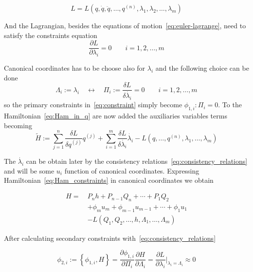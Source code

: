 \begin{equation*}
  L = L(
  q, \dot{q}, \ddot{q}, \ldots, q^{(n)},
  \lambda_1, \lambda_2, \ldots, \lambda_m
  )
\end{equation*}

And the Lagrangian, besides the equations of motion~\eqref{eq:euler-lagrange},
need to satisfy the constraints equation
\begin{equation}
  \frac{\partial L}{\partial \lambda_i} = 0 \qquad i=1, 2, \ldots, m
\end{equation}

Canonical coordinates has to be choose also for $\lambda_i$ and the following
choice can be done
\begin{equation} \label{eq:def_canonical_coordinates_lambda}
  \Lambda_{i}:= \lambda_{i}
  \quad \leftrightarrow \quad
  \Pi_{i} := \frac{\delta L}{\delta \dot{\lambda_{i}}} = 0
  \qquad i = 1, 2, \ldots, m
\end{equation}
so the primary constraints in~\eqref{eq:constraint} simply become
$\phi_{1, i}: \Pi_i = 0$. To the Hamiltonian~\eqref{eq:Ham_in_q} are now added
the auxiliaries variables terms becoming
\begin{equation} \label{eq:Ham_constraints_in_q}
  \tilde{H} :=
  \sum_{j=1}^{n} \frac{\delta L}{\delta q^{(j)}} q^{(j)} +
  \sum_{i=1}^{m} \frac{\delta L}{\delta \dot{\lambda_i}} \dot{\lambda_i} -
  L(q, \ldots, q^{(n)}, \lambda_1, \ldots, \lambda_m)
\end{equation}

The $\dot{\lambda_i}$ can be obtain later by the consistency
relations~\eqref{eq:consistency_relations} and will be some $u_i$ function of
canonical coordinates. Expressing Hamiltonian~\eqref{eq:Ham_constraints} in
canonical coordinates we obtain

\begin{align} \label{eq:Ham_constraints}
  H =\ & P_n h + P_{n-1} Q_n + \cdots + P_1 Q_2 \nonumber \\
       & + \phi_m u_m + \phi_{m-1} u_{m-1} + \cdots + \phi_1 u_1 \nonumber \\
       & - L ( Q_1, Q_2, \ldots, h, \Lambda_1, \ldots, \Lambda_m)
\end{align}


After calculating secondary constraints with~\eqref{eq:consistency_relations}

\begin{equation*}
  \phi_{2, i} := \left\{ \phi_{1,i}, H \right\} =
  \frac{\partial \phi_{1,i}}{\partial \Pi_i}
  \frac{\partial H}{\partial \Lambda_i} =
  \frac{\partial L}{\partial \lambda_i} \Big|_{\lambda_i = \Lambda_i}
  \approx 0
\end{equation*}


